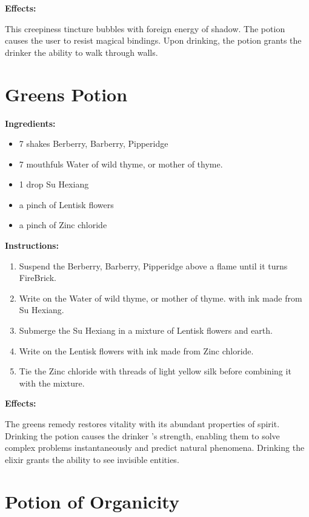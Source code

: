 \documentclass{article}
\begin{document}
\textbf{Effects:}

This creepiness tincture bubbles with foreign energy of shadow. The potion causes the user to resist magical bindings. Upon drinking, the potion grants the drinker the ability to walk through walls.

\newpage
\section*{Greens Potion}

\textbf{Ingredients:}

\begin{itemize}
  \item 7 shakes Berberry, Barberry, Pipperidge
  \item 7 mouthfuls Water of wild thyme, or mother of thyme.
  \item 1 drop Su Hexiang
  \item a pinch of Lentisk flowers
  \item a pinch of Zinc chloride
\end{itemize}

\textbf{Instructions:}

\begin{enumerate}
  \item Suspend the Berberry, Barberry, Pipperidge above a flame until it turns FireBrick.
  \item Write on the Water of wild thyme, or mother of thyme. with ink made from Su Hexiang.
  \item Submerge the Su Hexiang in a mixture of Lentisk flowers and earth.
  \item Write on the Lentisk flowers with ink made from Zinc chloride.
  \item Tie the Zinc chloride with threads of light yellow silk before combining it with the mixture.
\end{enumerate}

\textbf{Effects:}

The greens remedy restores vitality with its abundant properties of spirit. Drinking the potion causes the drinker 's strength, enabling them to solve complex problems instantaneously and predict natural phenomena. Drinking the elixir grants the ability to see invisible entities.

\newpage
\section*{Potion of Organicity}
\end{document}
